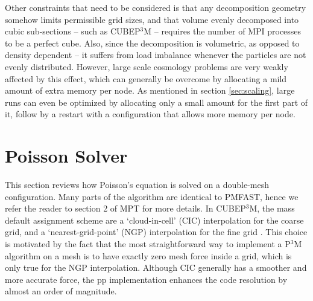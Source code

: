 \documentclass[useAMS,usenatbib]{mn2e}
\begin{document}
Other constraints that need to be considered is that any decomposition geometry somehow 
limits permissible grid sizes, and that volume evenly decomposed into cubic sub-sections 
--  such as {\small CUBEP$^3$M} -- requires the number of {\small MPI} processes to be a perfect cube.
Also,  since the decomposition is volumetric, as opposed to density dependent -- 
it suffers from load imbalance whenever the particles are not evenly distributed.
However, large scale cosmology problems are very weakly affected by this effect, which
can generally  be overcome by allocating a mild amount of extra memory per node.
As mentioned in section \ref{sec:scaling}, large runs can even be optimized by  allocating only a small amount for the first part of it,
follow by a restart with a configuration that allows more memory per node.

%

\section{Poisson Solver}
\label{sec:Poisson}


This section reviews how Poisson's equation is solved on a double-mesh configuration. 
Many parts of the algorithm are identical to {\small PMFAST}, hence we refer the reader 
to section 2 of MPT for more details. In {\small CUBEP$^3$M}, the mass default assignment scheme are
a `cloud-in-cell' (CIC) interpolation for the coarse grid,  and a `nearest-grid-point' (NGP) interpolation 
for the fine grid \citep{1981csup.book.....H}. This choice is motivated by the fact that the most straightforward 
way to implement a P$^3$M algorithm on a mesh is to have exactly zero mesh force inside a grid, 
which is only true for the NGP interpolation. Although CIC generally has a smoother and more accurate force,
the pp implementation enhances the code resolution by almost an order of magnitude. 
\end{document}
